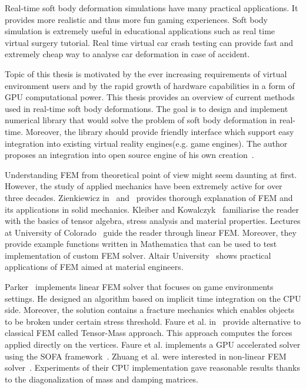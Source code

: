 \documentclass[en]{minipw} %
\begin{document}
Real-time soft body deformation simulations have many practical applications. It provides more realistic and thus more fun gaming experiences. Soft body simulation is extremely useful in educational applications such as real time virtual surgery tutorial. Real time virtual car crash testing can provide fast and extremely cheap way to analyse car deformation in case of accident.

Topic of this thesis is motivated by the ever increasing requirements of virtual environment users and by the rapid growth of hardware capabilities in a form of GPU computational power. This thesis provides an overview of current methods used in real-time soft body deformations. The goal is to design and implement numerical library that would solve the problem of soft body deformation in real-time. Moreover, the library should provide friendly interface which support easy integration into existing virtual reality engines(e.g. game engines). The author proposes an integration into open source engine of his own creation~\cite{ifx}.

Understanding FEM from theoretical point of view might seem daunting at first. However, the study of applied mechanics have been extremely active for over three decades. Zienkiewicz in~\cite{zienkiewicz1} and~\cite{zienkiewicz2} provides thorough explanation of FEM and its applications in solid mechanics. Kleiber and Kowalczyk~\cite{termo} familiarise the reader with the basics of tensor algebra, stress analysis and material properties. Lectures at University of Colorado~\cite{colorado_fem_lectures} guide the reader through linear FEM. Moreover, they provide example functions written in Mathematica that can be used to test implementation of custom FEM solver. Altair University~\cite{altair} shows practical applications of FEM aimed at material engineers.

Parker~\cite{parker} implements linear FEM solver that focuses on game environments settings. He designed an algorithm based on implicit time integration on the CPU side. Moreover, the solution contains a fracture mechanics which enables objects to be broken under certain stress threshold.
Faure et al. in~\cite{tensor-mass} provide alternative to classical FEM called Tensor-Mass approach. This approach computes the forces applied directly on the vertices. Faure et al. implements a GPU accelerated solver using the SOFA framework~\cite{sofa}.
Zhuang et al. were interested in non-linear FEM solver~\cite{global_deformation}. Experiments of their CPU implementation gave reasonable results thanks to the diagonalization of mass and damping matrices.
\end{document}
